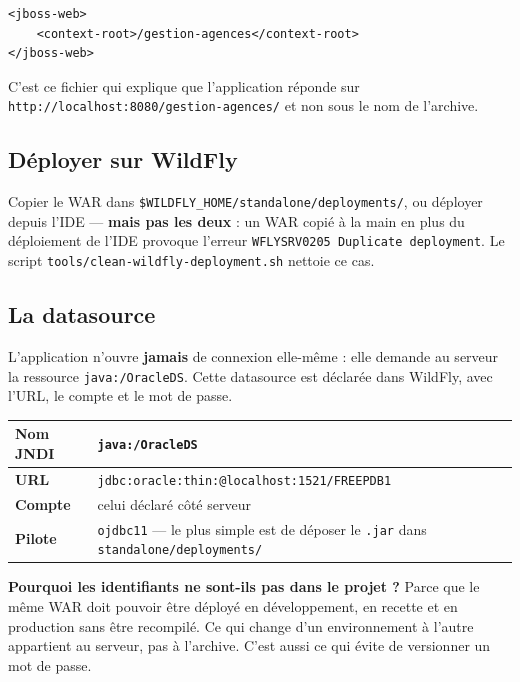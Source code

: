 \begin{lstlisting}[style=xml]
<jboss-web>
    <context-root>/gestion-agences</context-root>
</jboss-web>
\end{lstlisting}

C'est ce fichier qui explique que l'application réponde sur
\texttt{http://localhost:8080/gestion-agences/} et non sous le nom de
l'archive.

\subsection{Déployer sur WildFly}

Copier le WAR dans \texttt{\$WILDFLY\_HOME/standalone/deployments/}, ou
déployer depuis l'IDE --- \textbf{mais pas les deux} : un WAR copié à la main
en plus du déploiement de l'IDE provoque l'erreur \texttt{WFLYSRV0205
Duplicate deployment}. Le script \texttt{tools/clean-wildfly-deployment.sh}
nettoie ce cas.

\subsection{La datasource}

L'application n'ouvre \textbf{jamais} de connexion elle-même : elle demande au
serveur la ressource \texttt{java:/OracleDS}. Cette datasource est déclarée
dans WildFly, avec l'URL, le compte et le mot de passe.

\noindent\begin{tabularx}{\textwidth}{|>{\bfseries}L{4cm}|X|}
\hline
Nom JNDI & \texttt{java:/OracleDS}\\
\hline
URL & \texttt{jdbc:oracle:thin:@localhost:1521/FREEPDB1}\\
\hline
Compte & celui déclaré côté serveur\\
\hline
Pilote & \texttt{ojdbc11} --- le plus simple est de déposer le \texttt{.jar} dans \texttt{standalone/deployments/}\\
\hline
\end{tabularx}

\begin{retenir}
\textbf{Pourquoi les identifiants ne sont-ils pas dans le projet ?} Parce que
le même WAR doit pouvoir être déployé en développement, en recette et en
production sans être recompilé. Ce qui change d'un environnement à l'autre
appartient au serveur, pas à l'archive. C'est aussi ce qui évite de versionner
un mot de passe.
\end{retenir}

